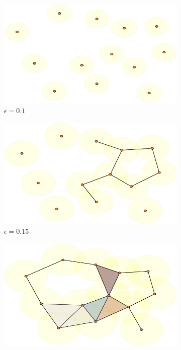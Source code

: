\begin{figure}
  \centering
  \begin{subfigure}[t]{.5\linewidth}
    \includegraphics[scale=.5]{rips_eps=01.pdf}
    \caption{$\epsilon=0.1$}
 \end{subfigure}%
  \begin{subfigure}[t]{.5\linewidth}
    \includegraphics[scale=.5]{rips_eps=015.pdf}
    \caption{$\epsilon=0.15$}
 \end{subfigure}
  \begin{subfigure}[b]{.49\linewidth}
    \includegraphics[scale=.5]{rips_eps=02.pdf}

\end{subfigure}
\end{figure}
